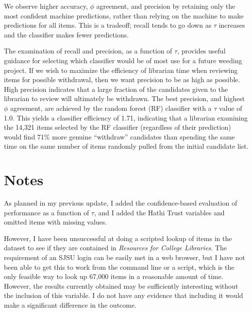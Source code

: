 \documentclass[man,11pt]{apa6}
\begin{document}
We observe higher accuracy, $\phi$ agreement, and precision by
retaining only the most confident machine predictions, rather than
relying on the machine to make predictions for all items.  This is a
tradeoff; recall tends to go down as $\tau$ increases and the
classifier makes fewer predictions.

The examination of recall and precision, as a function of $\tau$,
provides useful guidance for selecting which classifier would be of
most use for a future weeding project.  If we wish to maximize the
efficiency of librarian time when reviewing items for possible
withdrawal, then we want precision to be as high as possible.  High
precision indicates that a large fraction of the candidates given to
the librarian to review will ultimately be withdrawn.  The best
precision, and highest $\phi$ agreement, are achieved by the random
forest (RF) classifier with a $\tau$ value of 1.0.  This yields a
classifier efficiency of 1.71, indicating that a librarian examining
the 14,321 items selected by the RF classifier (regardless of their
prediction) would find 71\% more genuine ``withdraw'' candidates than
spending the same time on the same number of items randomly pulled
from the initial candidate list.

\section{Notes}

As planned in my previous update, I added the confidence-based
evaluation of performance as a function of $\tau$, and I added the
Hathi Trust variables and omitted items with missing values.

However, I have been unsuccessful at doing a scripted lookup of items
in the dataset to see if they are contained in {\em Resources for
  College Libraries}.  The requirement of an SJSU login can be easily
met in a web browser, but I have not been able to get this to work
from the command line or a script, which is the only feasible way to
look up 67,000 items in a reasonable amount of time.  However, the
results currently obtained may be sufficiently interesting without the
inclusion of this variable.  I do not have any evidence that including
it would make a significant difference in the outcome.
\end{document}
